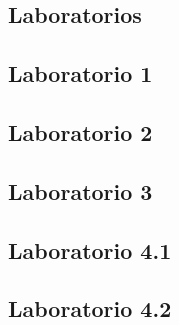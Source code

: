 \documentclass[letterpaper,11pt]{article} %
\theoremstyle{defbreak}
\theoremstyle{propbreak}
\theoremstyle{remark}
\theoremstyle{break}
\begin{document}
\newpage
\begin{anexo}

\section{Laboratorios}
\subsection[Laboratorio 1 - Monte Carlo y eficiencia de simulación]{Laboratorio 1}


\newpage
\subsection[Laboratorio 2 - Reducción de varianza y cadenas de Markov]{Laboratorio 2}


\newpage
\subsection[Laboratorio 3 - Algoritmos estocásticos usando cadenas de Markov]{Laboratorio 3}


\newpage
\subsection[Laboratorio 4.1 - Descenso de gradiente estocástico y aplicaciones]{Laboratorio 4.1}


\newpage
\subsection[Laboratorio 4.2 - Integral estocástica y EDEs]{Laboratorio 4.2}

\end{anexo}

\end{document}
